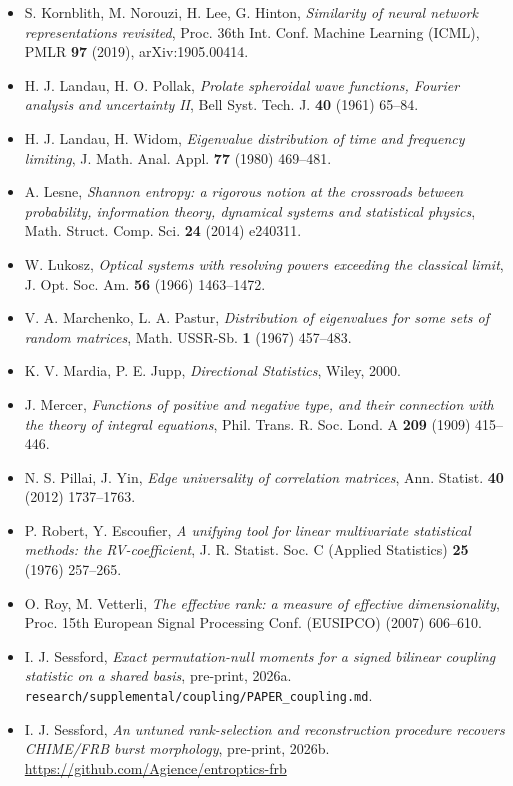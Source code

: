 \documentclass[10pt,letterpaper,twocolumn]{article}
\begin{document}
\begin{itemize}
\item
  S. Kornblith, M. Norouzi, H. Lee, G. Hinton, \emph{Similarity of neural network representations revisited}, Proc. 36th Int. Conf. Machine Learning (ICML), PMLR \textbf{97} (2019), arXiv:1905.00414.
\item
  H. J. Landau, H. O. Pollak, \emph{Prolate spheroidal wave functions, Fourier analysis and uncertainty II}, Bell Syst. Tech. J. \textbf{40} (1961) 65--84.
\item
  H. J. Landau, H. Widom, \emph{Eigenvalue distribution of time and frequency limiting}, J. Math. Anal. Appl. \textbf{77} (1980) 469--481.
\item
  A. Lesne, \emph{Shannon entropy: a rigorous notion at the crossroads between probability, information theory, dynamical systems and statistical physics}, Math. Struct. Comp. Sci. \textbf{24} (2014) e240311.
\item
  W. Lukosz, \emph{Optical systems with resolving powers exceeding the classical limit}, J. Opt. Soc. Am. \textbf{56} (1966) 1463--1472.
\item
  V. A. Marchenko, L. A. Pastur, \emph{Distribution of eigenvalues for some sets of random matrices}, Math. USSR-Sb. \textbf{1} (1967) 457--483.
\item
  K. V. Mardia, P. E. Jupp, \emph{Directional Statistics}, Wiley, 2000.
\item
  J. Mercer, \emph{Functions of positive and negative type, and their connection with the theory of integral equations}, Phil. Trans. R. Soc. Lond. A \textbf{209} (1909) 415--446.
\item
  N. S. Pillai, J. Yin, \emph{Edge universality of correlation matrices}, Ann. Statist. \textbf{40} (2012) 1737--1763.
\item
  P. Robert, Y. Escoufier, \emph{A unifying tool for linear multivariate statistical methods: the RV-coefficient}, J. R. Statist. Soc. C (Applied Statistics) \textbf{25} (1976) 257--265.
\item
  O. Roy, M. Vetterli, \emph{The effective rank: a measure of effective dimensionality}, Proc. 15th European Signal Processing Conf. (EUSIPCO) (2007) 606--610.
\item
  I. J. Sessford, \emph{Exact permutation-null moments for a signed bilinear coupling statistic on a shared basis}, pre-print, 2026a. \texttt{research/\allowbreak{}supplemental/\allowbreak{}coupling/\allowbreak{}PAPER\_\allowbreak{}coupling.\allowbreak{}md}.
\item
  I. J. Sessford, \emph{An untuned rank-selection and reconstruction procedure recovers CHIME/FRB burst morphology}, pre-print, 2026b. \href{https://github.com/Agience/entroptics-frb}{https:\allowbreak{}/\allowbreak{}/\allowbreak{}github.\allowbreak{}com/\allowbreak{}Agience/\allowbreak{}entropti\allowbreak{}cs-\allowbreak{}frb}

\end{itemize}
\end{document}

